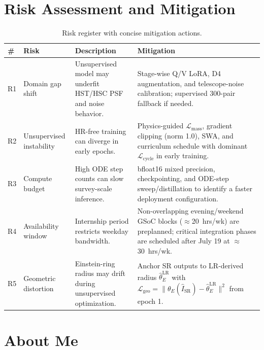 \documentclass[11pt,a4paper]{article}
\newcommand{\Lcyc}{\mathcal{L}_{\text{cycle}}}
\newcommand{\Lmass}{\mathcal{L}_{\text{mass}}}
\begin{document}
\vspace{6pt}

\section{Risk Assessment and Mitigation}
\label{sec:risks}

\begin{table}[H]
\centering
\caption{Risk register with concise mitigation actions.}
\small
\begin{tabularx}{\linewidth}{C{0.8cm} L{2.5cm} Y Y}
\toprule
\textbf{\#} & \textbf{Risk} & \textbf{Description} & \textbf{Mitigation} \\
\midrule
{}
R1 & Domain gap shift & Unsupervised model may underfit HST/HSC PSF and noise behavior. & Stage-wise Q/V LoRA, D4 augmentation, and telescope-noise calibration; supervised 300-pair fallback if needed. \\
\midrule
{}
R2 & Unsupervised instability & HR-free training can diverge in early epochs. & Physics-guided $\Lmass$, gradient clipping (norm 1.0), SWA, and curriculum schedule with dominant $\Lcyc$ in early training. \\
\midrule
{}
R3 & Compute budget & High ODE step counts can slow survey-scale inference. & bfloat16 mixed precision, checkpointing, and ODE-step sweep/distillation to identify a faster deployment configuration. \\
\midrule
{}
R4 & Availability window & Internship period restricts weekday bandwidth. & Non-overlapping evening/weekend GSoC blocks ($\approx$20~hrs/wk) are preplanned; critical integration phases are scheduled after July 19 at $\approx$30~hrs/wk. \\
\midrule
{}
R5 & Geometric distortion & Einstein-ring radius may drift during unsupervised optimization. & Anchor SR outputs to LR-derived radius $\hat{\theta}_E^{\text{LR}}$ with $\mathcal{L}_{\text{geo}} = \|\theta_E(\hat{I}_{\text{SR}}) - \hat{\theta}_E^{\text{LR}}\|^2$ from epoch 1. \\
\bottomrule
\end{tabularx}
\normalsize
\end{table}

\vspace{6pt}

\section{About Me}
\end{document}
